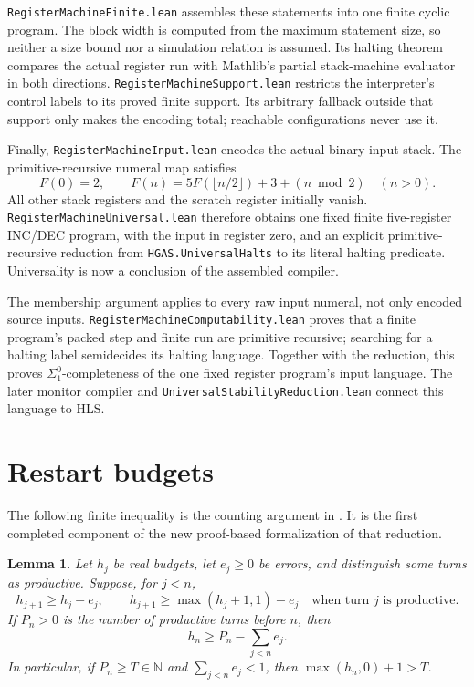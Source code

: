 \documentclass[11pt]{article}
\newtheorem{lemma}[theorem]{Lemma}
\newcommand{\N}{\mathbb N}
\newcommand{\code}[1]{{\small\nolinkurl{#1}}}
\begin{document}
\code{RegisterMachineFinite.lean} assembles these statements into one
finite cyclic program. The block width is computed from the maximum
statement size, so neither a size bound nor a simulation relation is
assumed. Its halting theorem compares the actual register run with
Mathlib's partial stack-machine evaluator in both directions.
\code{RegisterMachineSupport.lean} restricts the interpreter's control
labels to its proved finite support. Its arbitrary fallback outside that
support only makes the encoding total; reachable configurations never
use it.

Finally, \code{RegisterMachineInput.lean} encodes the actual binary input
stack. The primitive-recursive numeral map satisfies
\[
 F(0)=2,\qquad F(n)=5F(\lfloor n/2\rfloor)+3+(n\bmod2)\quad(n>0).
\]
All other stack registers and the scratch register initially vanish.
\code{RegisterMachineUniversal.lean} therefore obtains one fixed finite
five-register INC/DEC program, with the input in register zero, and an
explicit primitive-recursive reduction from \code{HGAS.UniversalHalts}
to its literal halting predicate. Universality is now a conclusion of
the assembled compiler.

The membership argument applies to every raw input numeral, not only
encoded source inputs. \code{RegisterMachineComputability.lean} proves
that a finite program's packed step and finite run are primitive recursive;
searching for a halting label semidecides its halting language. Together
with the reduction, this proves $\Sigma^0_1$-completeness of the one fixed
register program's input language. The later monitor compiler and
\code{UniversalStabilityReduction.lean} connect this language to HLS.

\section{Restart budgets}

The following finite inequality is the counting argument in
\cite[Proposition 4.5, Step 3]{korda}. It is the first completed component
of the new proof-based formalization of that reduction.

\begin{lemma}
Let $h_j$ be real budgets, let $e_j\ge0$ be errors, and distinguish some
turns as productive. Suppose, for $j<n$,
\[
 h_{j+1}\ge h_j-e_j,
 \qquad
 h_{j+1}\ge\max(h_j+1,1)-e_j
 \quad\text{when turn $j$ is productive}.
\]
If $P_n>0$ is the number of productive turns before $n$, then
\[
 h_n\ge P_n-\sum_{j<n}e_j.
\]
In particular, if $P_n\ge T\in\N$ and $\sum_{j<n}e_j<1$, then
$\max(h_n,0)+1>T$.
\end{lemma}
\end{document}

